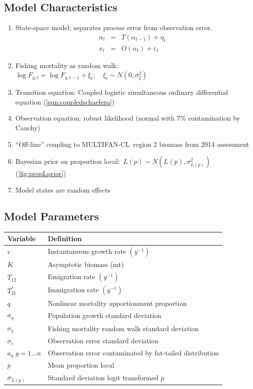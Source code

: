 \documentclass[a4paper,KOMA,landscape,titlepage]{powersem}
\newcommand\MFCL{MULTIFAN-CL}
\begin{document}
\begin{slide}\section{Model Characteristics}
\begin{enumerate}
\item State-space model; separates process error from observation
error.
\begin{eqnarray}
\alpha_t &=&T(\alpha_{t-1}) + \eta_t\\
x_t &=& O(\alpha_t) + \varepsilon_t
\end{eqnarray}
\item Fishing mortality as random walk:~
$\log F_{g,t} = \log F_{g,t-1} + \xi_t;\quad \xi_t\sim
N(0,\sigma^2_\xi)$
\item Transition equation: Coupled logistic simultaneous ordinary
differential equation (\ref{eqn:coupledschaeferq})
\item Observation equation: robust likelihood (normal with 7\%
contamination by Cauchy) 
\item ``Off-line'' coupling to \MFCL\ region 2 biomass from 2014 assessment
\item Bayesian prior on proportion local:~$L(p)\sim
N(L(\bar{p}),\sigma^2_{L(p)})$
(\ref{fig:propLprior})
\item Model states are random effects
\end{enumerate}
\end{slide}

\begin{slide}\section{Model Parameters}
\begin{center}
\begin{tabular}{ll}
\hline
Variable & Definition\\
\hline
\hline
$r$ & Instantaneous growth rate $(y^{-1})$\\
$K$ & Asymptotic biomass (mt) \\
$T_{12}$ & Emigration rate $(y^{-1})$\\
$T^*_{21}$& Immigration rate $(y^{-1})$\\
$q$ & Nonlinear mortality apportionment proportion\\
\hline
$\sigma_\eta$ & Population growth standard deviation\\
$\sigma_\xi$ & Fishing mortality random walk standard deviation\\
$\sigma_\varepsilon$ & Observation error standard deviation \\
$a_g\; g=1\ldots n$ & Observation error contaminated by 
fat-tailed distribution\\
\hline
$\bar{p}$ & Mean proportion local\\
$\sigma_{L(p)}$ & Standard deviation logit transformed $\bar{p}$\\
\hline
\end{tabular}
\end{center}
\end{slide}
\end{document}
